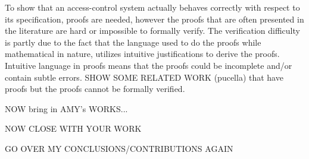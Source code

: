 To show that an access-control system actually behaves correctly with respect to its specification, proofs are needed, however the proofs that are often presented in the literature are hard or impossible to formally verify. The verification difficulty is partly due to the fact that the language used to do the proofs while mathematical in nature, utilizes intuitive justifications to derive the proofs. Intuitive language in proofs means that the proofs could be incomplete and/or contain subtle errors. SHOW SOME RELATED WORK (pucella) that have proofs but the proofs cannot be formally verified.


NOW bring in AMY's WORKS...

NOW CLOSE WITH YOUR WORK


GO OVER MY CONCLUSIONS/CONTRIBUTIONS AGAIN





























